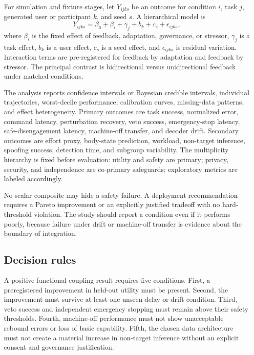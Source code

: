 \documentclass[conference]{IEEEtran}
\begin{document}
For simulation and fixture stages, let $Y_{ijks}$ be an outcome for condition $i$, task $j$, generated user or participant $k$, and seed $s$. A hierarchical model is
\begin{equation}
Y_{ijks}=\beta_0+\beta_i+\gamma_j+b_k+c_s+\epsilon_{ijks},
\label{eq:hierarchical}
\end{equation}
where $\beta_i$ is the fixed effect of feedback, adaptation, governance, or stressor, $\gamma_j$ is a task effect, $b_k$ is a user effect, $c_s$ is a seed effect, and $\epsilon_{ijks}$ is residual variation. Interaction terms are pre-registered for feedback by adaptation and feedback by stressor. The principal contrast is bidirectional versus unidirectional feedback under matched conditions.

The analysis reports confidence intervals or Bayesian credible intervals, individual trajectories, worst-decile performance, calibration curves, missing-data patterns, and effect heterogeneity. Primary outcomes are task success, normalized error, command latency, perturbation recovery, veto success, emergency-stop latency, safe-disengagement latency, machine-off transfer, and decoder drift. Secondary outcomes are effort proxy, body-state prediction, workload, non-target inference, spoofing success, detection time, and subgroup variability. The multiplicity hierarchy is fixed before evaluation: utility and safety are primary; privacy, security, and independence are co-primary safeguards; exploratory metrics are labeled accordingly.

No scalar composite may hide a safety failure. A deployment recommendation requires a Pareto improvement or an explicitly justified tradeoff with no hard-threshold violation. The study should report a condition even if it performs poorly, because failure under drift or machine-off transfer is evidence about the boundary of integration.

\subsection{Decision rules}

A positive functional-coupling result requires five conditions. First, a preregistered improvement in held-out utility must be present. Second, the improvement must survive at least one unseen delay or drift condition. Third, veto success and independent emergency stopping must remain above their safety thresholds. Fourth, machine-off performance must not show unacceptable rebound errors or loss of basic capability. Fifth, the chosen data architecture must not create a material increase in non-target inference without an explicit consent and governance justification.
\end{document}
